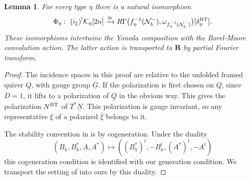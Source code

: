 \documentclass[11pt,reqno]{amsart}
\newtheorem{Lemma}[Theorem]{Lemma}
\theoremstyle{definition}
\theoremstyle{remark}
\def\dN{\underline N}
\def\dG{\underline G}
\def\dQ{\underline Q}
\def\calN{\mathcal N}
\def\bR{\mathbf R}
\begin{document}
\begin{Lemma}\label{BTP}
For every type $\eta$
there is a natural isomorphism
\begin{equation}\label{C4}
 \Phi_\eta:\ (i_\xi)^!\mathcal K_\eta[2n]\xrightarrow{\cong}
 R\Gamma\bigl(f_\eta^{-1}(\calN_b^-),
                 \omega_{f_\eta^{-1}(\calN_b^-)}\bigr)
                 [\delta_\eta^{\rm BT}].
\end{equation}
These isomorphisms intertwine the Yoneda composition with the 
Borel-Moore convolution action. The
latter action is transported to $\bR$ by partial Fourier transform.
\end{Lemma}

\begin{proof}
The incidence spaces in this proof are relative to the unfolded framed quiver $\dQ$, with gauge group $\dG$.
If the polarization is first chosen on $Q$, since $D=1$, it lifts to a polarization of $\dQ$ in the obvious way. 
This gives the polarization $N^{\rm BT}$ of $T^*\dN$. 
This polarization is gauge invariant, so any representative $\xi$ of a polarized $\bar\xi$ belongs to it.


The stability  convention in \cite[\S\S1.1.4, 1.3.5]{BT26} is by cogeneration. 
Under the duality
\[
 (B_h,B_h^*,A,A^*)\longmapsto
 ((B_h^*)^t,-B_h^t,(A^*)^t,-A^t)
\]
this cogeneration condition is identified with our generation condition. 
We transport the setting of \cite{BT26} into ours by this duality.




\end{proof}
\end{document}
